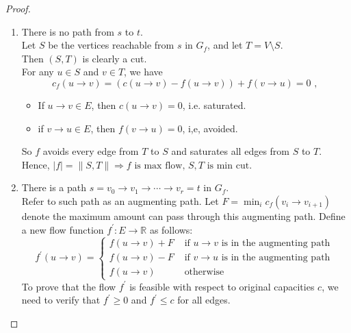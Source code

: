 \begin{proof}
\begin{enumerate}[label={Case \arabic*}, leftmargin=1in]
    \item There is no path from $s$ to $t$.\\
        Let $S$ be the vertices reachable from $s$ in $G_f$,
        and let $T = V \setminus S$. \\
        Then $(S,T)$ is clearly a cut.\\
        For any $u \in S$ and $v \in T$, we have 
        \[c_f(u \rightarrow v) = (c(u \rightarrow v) - f(u \rightarrow v)) + f(v \rightarrow u) =  0 \text{ , }\]
        \begin{itemize}
            \item If $u \rightarrow v \in E$, then $c(u \rightarrow v) = 0$, i.e. saturated.
            \item if $v \rightarrow u \in E$, then $f(v \rightarrow u) = 0$, i,e, avoided.
        \end{itemize}
        So $f$ avoids every edge from $T$ to $S$ and saturates all edges from $S$ to $T$.\\
        Hence, $|f| = \|S,T\| \Rightarrow f \text{ is max flow, } S,T \text{ is min cut. }$
    \item There is a path $s = v_0 \rightarrow v_1 \rightarrow \cdots \rightarrow v_r = t$ in $G_f$.\\
        Refer to such path as an augmenting path.
        Let $F = \min_i c_f(v_i \rightarrow v_{i+1})$ denote the maximum
        amount can pass through this augmenting path.
        Define a new flow function $f^\prime:E \rightarrow \mathbb{R}$ as follows:
        \begin{equation}
            f^\prime(u \rightarrow v) =
            \begin{cases}
                f(u \rightarrow v) + F & \text{ if } u \rightarrow v \text{ is in the augmenting path } \\
                f(u \rightarrow v) - F & \text{ if } v \rightarrow u \text{ is in the augmenting path } \\
                f(u \rightarrow v) & \text{ otherwise }
            \end{cases}
        \end{equation}
        To prove that the flow $f^\prime$ is feasible with respect to original capacities $c$,
        we need to verify that $f^\prime \geq 0$ and $f^\prime \leq c$ for all edges.
\end{enumerate}
\end{proof}
